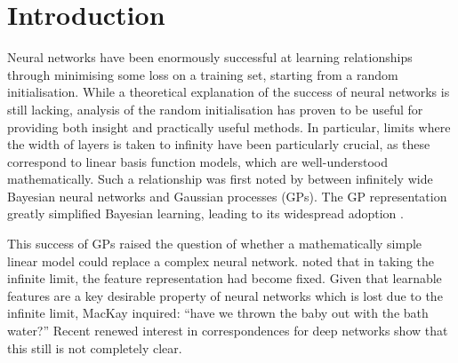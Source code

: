 \documentclass{article}
\newcommand{\markcomment}[1]{\todo[color=green]{#1}\xspace}
\newcommand{\adriacomment}[1]{\todo[color=blue]{#1}\xspace}
\begin{document}
\section{Introduction}
Neural networks have been enormously successful at learning relationships through minimising some loss on a training set, starting from a random initialisation. While a theoretical explanation of the success of neural networks is still lacking, analysis of the random initialisation has proven to be useful for providing both insight %
and practically useful methods.
In particular, limits where the width of layers is taken to infinity have been particularly crucial, as these correspond to linear basis function models, which are well-understood mathematically.
Such a relationship was first noted by \citet{neal1996bayesian} between infinitely wide Bayesian neural networks and Gaussian processes (GPs). The GP representation greatly simplified Bayesian learning, leading to its widespread adoption \citep{williams1996gpr,gpml}.

This success of GPs raised the question of whether a mathematically simple linear model could replace a complex neural network. \citet{mackay1998introgp} noted that in taking the infinite limit, the feature representation had become fixed. Given that learnable features are a key desirable property of neural networks which is lost due to the infinite limit, MacKay inquired: ``have we thrown the baby out with the bath water?'' Recent renewed interest in correspondences for deep networks \citep{matthews2018dnnlimit,lee2018dnnlimit} show that this still is not completely clear.
\end{document}
